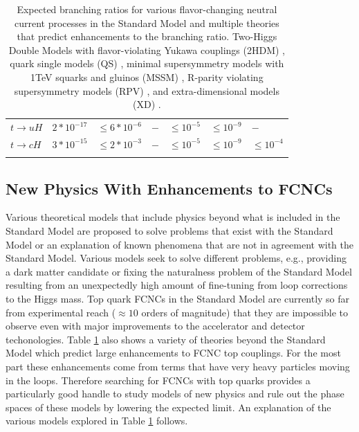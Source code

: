 \begin{table}[]
\begin{center}
\begin{tabular}{lllllll}
$t\rightarrow u H                    $ & $ 2*10^{-17} $  & $ \leq 6*10^{-6} $ & $ -                      $ & $ \leq 10^{-5} $ & $ \leq 10^{-9} $     & $ -    $                                           \\
$t\rightarrow c H                    $ & $ 3*10^{-15} $  & $ \leq 2*10^{-3} $ & $ -                      $ & $ \leq 10^{-5} $ & $ \leq 10^{-9} $     & $ \leq 10^{-4} $ \\
\hhline{=======}
\end{tabular}
	\caption[Expected branching ratios for various flavor-changing neutral current processes in the Standard Model and multiple theories that predict enhancements to the branching ratio.  Two-Higgs Double Models with flavor-violating Yukawa couplings (2HDM), quark single models (QS), minimal supersymmetry models with 1TeV squarks and gluinos (MSSM), R-parity violating supersymmetry models (RPV), and extra-dimensional models (XD).]{Expected branching ratios for various flavor-changing neutral current processes in the Standard Model\cite{2HDM-2} and multiple theories that predict enhancements to the branching ratio.  Two-Higgs Double Models with flavor-violating Yukawa couplings (2HDM) \cite{2HDM-2,2HDM-3}, quark single models (QS) \cite{QS-1,QS-2}, minimal supersymmetry models with 1TeV squarks and gluinos (MSSM) \cite{MSSM}, R-parity violating supersymmetry models (RPV) \cite{RPVSusyFCNC}, and extra-dimensional models (XD) \cite{XDFCNC}.}
	\label{tab:FCNCLimits}
\end{center}
\end{table}

\subsection{New Physics With Enhancements to FCNCs}
\label{sec:bsmFCNC}
Various theoretical models that include physics beyond what is included in the Standard Model are proposed to solve problems that exist with the Standard Model or an explanation of known phenomena that are not in agreement with the Standard Model.  Various models seek to solve different problems, e.g., providing a dark matter candidate or fixing the naturalness problem of the Standard Model resulting from an unexpectedly high amount of fine-tuning from loop corrections to the Higgs mass.  
Top quark FCNCs in the Standard Model are currently so far from experimental reach ($\approx 10$ orders of magnitude) that they are impossible to observe even with major improvements to the accelerator and detector techonologies.  Table \ref{tab:FCNCLimits} also shows a variety of theories beyond the Standard Model which predict large enhancements to FCNC top couplings.  For the most part these enhancements come from terms that have very heavy particles moving in the loops.  Therefore searching for FCNCs with top quarks provides a particularly good handle to study models of new physics and rule out the phase spaces of these models by lowering the expected limit.  An explanation of the various models explored in Table \ref{tab:FCNCLimits} follows.

